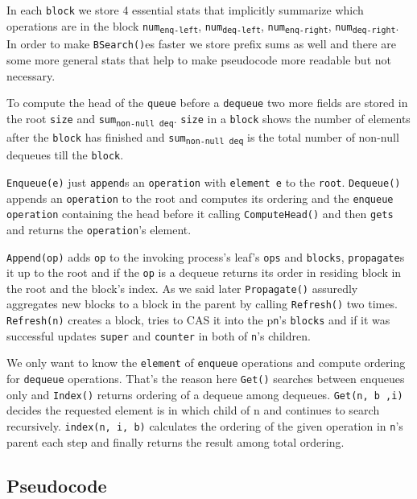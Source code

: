 \documentclass[10pt]{article}
\theoremstyle{definition}
\begin{document}
In each \texttt{block} we store 4 essential stats that implicitly summarize which operations are in the block \texttt{num\textsubscript{enq-left}}, \texttt{num\textsubscript{deq-left}}, \texttt{num\textsubscript{enq-right}}, \texttt{num\textsubscript{deq-right}}. In order to make \texttt{BSearch()}es faster we store prefix sums as well and there are some more general stats that help to make pseudocode more readable but not necessary.

To compute the head of the \texttt{queue} before a \texttt{dequeue} two more fields are stored in the root \texttt{size} and \texttt{sum\textsubscript{non-null deq}}. \texttt{size} in a \texttt{block} shows the number of elements after the \texttt{block} has finished and \texttt{sum\textsubscript{non-null deq}} is the total number of non-null dequeues till the \texttt{block}.

\texttt{Enqueue(e)} just \texttt{append}s an \texttt{operation} with \texttt{element e} to the \texttt{root}. \texttt{Dequeue()} appends an \texttt{operation} to the root and computes its ordering and the \texttt{enqueue operation} containing the head before it calling \texttt{ComputeHead()} and then \texttt{gets} and returns the \texttt{operation}'s element.

\texttt{Append(op)} adds \texttt{op} to the invoking process's leaf's \texttt{ops} and \texttt{blocks}, \texttt{propagate}s it up to the root and if the \texttt{op} is a dequeue returns its order in residing block in the root and the block's index. As we said later \texttt{Propagate()} assuredly aggregates new blocks to a block in the parent by calling \texttt{Refresh()} two times. \texttt{Refresh(n)} creates a block, tries to CAS it into the p\texttt{n}'s \texttt{blocks} and if it was successful updates \texttt{super} and \texttt{counter} in both of \texttt{n}'s children.

We only want to know the \texttt{element} of \texttt{enqueue} operations and compute ordering for \texttt{dequeue} operations. That's the reason here \texttt{Get()} searches between enqueues only and \texttt{Index()} returns ordering of a dequeue among dequeues. \texttt{Get(n, b ,i)} decides the requested element is in which child of n and continues to search recursively. \texttt{index(n, i, b)} calculates the ordering of the given operation in \texttt{n}'s parent each step and finally returns the result among total ordering.



\pagebreak
\subsection{Pseudocode}
\end{document}
